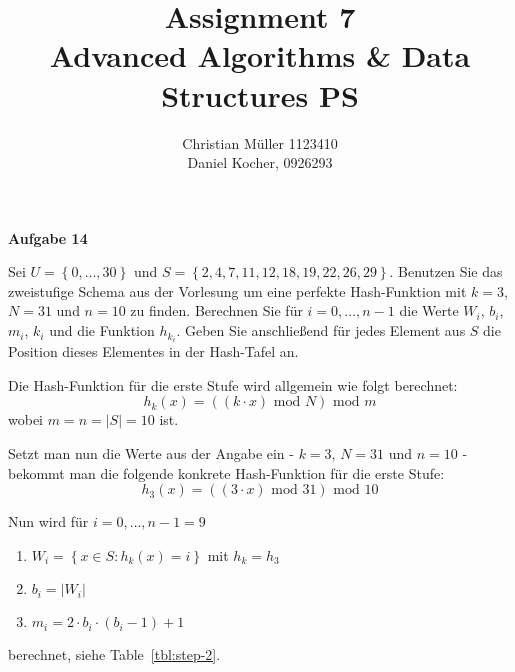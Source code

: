 \documentclass{article}
\begin{document}
\title{Assignment 7 \\ Advanced Algorithms \& Data Structures PS}%
\author{Christian Müller 1123410 \\ Daniel Kocher, 0926293}%
\maketitle

{\bfseries Aufgabe 14}%

Sei $U = \left\{ 0, \ldots, 30 \right\}$ und
$S = \left\{ 2, 4, 7, 11, 12, 18, 19, 22, 26, 29 \right\}$. Benutzen Sie das
zweistufige Schema aus der Vorlesung um eine perfekte Hash-Funktion mit $k = 3$,
$N = 31$ und $n = 10$ zu finden. Berechnen Sie f{\"u}r $i = 0, \ldots, n - 1$ die
Werte $W_i$, $b_i$, $m_i$, $k_i$ und die Funktion $h_{k_i}$. Geben Sie
anschlie{\ss}end f{\"u}r jedes Element aus $S$ die Position dieses Elementes in
der Hash-Tafel an.

Die Hash-Funktion f{\"u}r die erste Stufe wird allgemein wie folgt berechnet:
\begin{equation}
  h_k \left( x \right) = \left( \left( k \cdot x \right)\text{ mod }N \right)\text{ mod }m
\end{equation}
wobei $m = n = |S| = 10$ ist.

Setzt man nun die Werte aus der Angabe ein - $k = 3$, $N = 31$ und $n = 10$ -
bekommt man die folgende konkrete Hash-Funktion f{\"u}r die erste Stufe:
\begin{equation}
  h_3 \left( x \right) = \left( \left( 3 \cdot x \right)\text{ mod }31 \right)\text{ mod }10
  \label{eq:hk}
\end{equation}

Nun wird f{\"u}r $i = 0, \ldots, n - 1 = 9$
\parskip0pt\begin{enumerate}
  \item $W_i = \left\{ x \in S: h_k \left( x \right) = i \right\}$ mit $h_k = h_3$
  \item $b_i = | W_i |$
  \item $m_i = 2 \cdot b_i \cdot \left( b_i - 1 \right) + 1$
\end{enumerate}
berechnet, siehe Table~\ref{tbl:step-2}.
\end{document}
